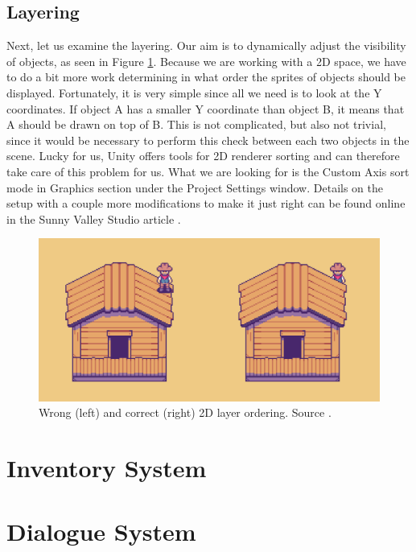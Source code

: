\subsection{Layering}
Next, let us examine the layering. Our aim is to dynamically adjust the visibility of objects, as seen in Figure \ref{fig:Layers}. Because we are working with a 2D space, we have to do a bit more work determining in what order the sprites of objects should be displayed. Fortunately, it is very simple since all we need is to look at the Y coordinates. If object A has a smaller Y coordinate than object B, it means that A should be drawn on top of B. This is not complicated, but also not trivial, since it would be necessary to perform this check between each two objects in the scene. Lucky for us, Unity offers tools for 2D renderer sorting \cite{Unity-sorting} and can therefore take care of this problem for us. What we are looking for is the Custom Axis sort mode \cite{Unity-customAxis} in Graphics section under the Project Settings window. Details on the setup with a couple more modifications to make it just right can be found online in the Sunny Valley Studio article \cite{Piotr} . 

\begin{figure}[H]
\centering
\includegraphics[width=.8\linewidth]{img/layers.png}
\caption{Wrong (left) and correct (right) 2D layer ordering. Source \cite{Piotr}.}
\label{fig:Layers}
\end{figure}

\section{Inventory System}


\section{Dialogue System}



